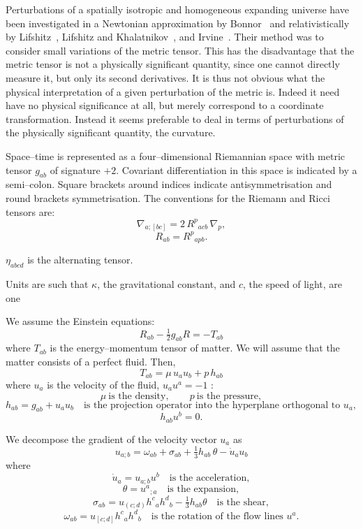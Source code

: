 
Perturbations of a spatially isotropic and homogeneous expanding 
universe have been investigated in a Newtonian approximation by 
Bonnor~\cite{Bonnor1957} and relativistically by Lifshitz~\cite{Lifshitz1946}, 
Lifshitz and Khalatnikov~\cite{LifshitzKhalatnikov1963}, 
and Irvine~\cite{Irvine1965}. Their method was to consider small 
variations of the metric tensor. This has the disadvantage that the 
metric tensor is not a physically significant quantity, since one 
cannot directly measure it, but only its second derivatives. 
It is thus not obvious what the physical interpretation of a given 
perturbation of the metric is. Indeed it need have no physical 
significance at all, but merely correspond to a coordinate transformation. 
Instead it seems preferable to deal in terms of perturbations of the 
physically significant quantity, the curvature.

Space--time is represented as a four--dimensional Riemannian space 
with metric tensor \(g_{ab}\) of signature \(+2\). Covariant differentiation 
in this space is indicated by a semi--colon. Square brackets around 
indices indicate antisymmetrisation and round brackets symmetrisation.  
The conventions for the Riemann and Ricci tensors are:
\[
\nabla_{a;[bc]} = 2\, R^{p}{}_{a c b}\, \nabla_{p},
\]
\[
R_{ab} = R^{p}{}_{a p b}.
\]

\(\eta_{abcd}\) is the alternating tensor.  

Units are such that \(\kappa\), the gravitational constant, and \(c\), the speed of light, are one



We assume the Einstein equations:
\[
R_{ab} - \tfrac{1}{2} g_{ab} R = -T_{ab}
\]
where \(T_{ab}\) is the energy--momentum tensor of matter.  
We will assume that the matter consists of a perfect fluid. Then,
\[
T_{ab} = \mu\, u_{a} u_{b} + p\, h_{ab}
\]
where \(u_{a}\) is the velocity of the fluid, \(u_{a} u^{a} = -1\) :
\[
\mu \ \text{is the density}, \qquad 
p \ \text{is the pressure},
\]
\[
h_{ab} = g_{ab} + u_{a} u_{b} \quad 
\text{is the projection operator into the hyperplane orthogonal to } u_{a},
\]
\[
h_{ab} u^{b} = 0.
\]

\medskip

We decompose the gradient of the velocity vector \(u_{a}\) as
\[
u_{a;b} = \omega_{ab} + \sigma_{ab} + \tfrac{1}{3} h_{ab} \, \theta - \dot{u}_{a} u_{b}
\]
where
\[
\dot{u}_{a} = u_{a;b} u^{b} \quad \text{is the acceleration},
\]
\[
\theta = u^{a}{}_{;a} \quad \text{is the expansion},
\]
\[
\sigma_{ab} = u_{(c;d)} h^{c}{}_{a} h^{d}{}_{b} - \tfrac{1}{3} h_{ab} \theta 
\quad \text{is the shear},
\]
\[
\omega_{ab} = u_{[c;d]} h^{c}{}_{a} h^{d}{}_{b} 
\quad \text{is the rotation of the flow lines } u^{a}.
\]

